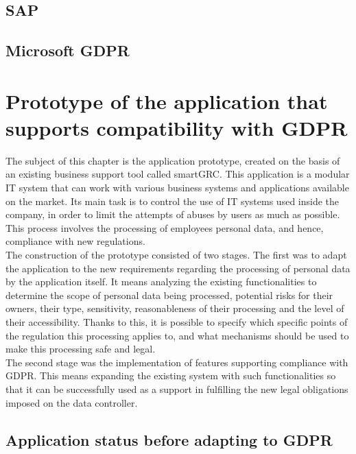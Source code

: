 \documentclass[en, noamssymb]{mgr}
\begin{document}
\section{SAP}



\section{Microsoft GDPR}



\chapter{Prototype of the application that supports compatibility with GDPR}\label{sec:sekcjaOpisPrototypu}

The subject of this chapter is the application prototype, created on the basis of an existing business support tool called smartGRC. This application is a modular IT system that can work with various business systems and applications available on the market. Its main task is to control the use of IT systems used inside the company, in order to limit the attempts of abuses by users as much as possible. This process involves the processing of employees personal data, and hence, compliance with new regulations.\\
\indent The construction of the prototype consisted of two stages. The first was to adapt the application to the new requirements regarding the processing of personal data by the application itself. It means analyzing the existing functionalities to determine the scope of personal data being processed, potential risks for their owners, their type, sensitivity, reasonableness of their processing and the level of their accessibility. Thanks to this, it is possible to specify which specific points of the regulation this processing applies to, and what mechanisms should be used to make this processing safe and legal.\\
\indent The second stage was the implementation of features supporting compliance with GDPR. This means expanding the existing system with such functionalities so that it can be successfully used as a support in fulfilling the new legal obligations imposed on the data controller.

\section{Application status before adapting to GDPR}
\end{document}
